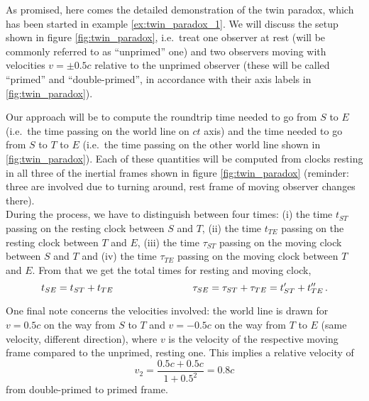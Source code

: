 \begin{ex}\label{ex:twin_paradox_2}
	As promised, here comes the detailed demonstration of the twin paradox, which has been started in example \ref{ex:twin_paradox_1}. We will discuss the setup shown in figure \ref{fig:twin_paradox}, i.e.~treat one observer at rest (will be commonly referred to as \enquote{unprimed} one) and two observers moving with velocities $v = \pm 0.5 c$ relative to the unprimed observer (these will be called \enquote{primed} and \enquote{double-primed}, in accordance with their axis labels in \ref{fig:twin_paradox}).
	
	Our approach will be to compute the roundtrip time needed to go from $S$ to $E$ (i.e.~the time passing on the world line on $ct$ axis) and the time needed to go from $S$ to $T$ to $E$ (i.e.~the time passing on the other world line shown in \ref{fig:twin_paradox}). Each of these quantities will be computed from clocks resting in all three of the inertial frames shown in figure \ref{fig:twin_paradox} (reminder: three are involved due to turning around, rest frame of moving observer changes there).\\
	
	
	During the process, we have to distinguish between four times: (i) the time $t_{ST}$ passing on the resting clock between $S$ and $T$, (ii) the time $t_{TE}$ passing on the resting clock between $T$ and $E$, (iii) the time $\tau_{ST}$ passing on the moving clock between $S$ and $T$ and (iv) the time $\tau_{TE}$ passing on the moving clock between $T$ and $E$. From that we get the total times for resting and moving clock,
	\begin{equation*}
		t_{SE} = t_{ST} + t_{TE}
		\qquad \qquad \qquad \qquad
		\tau_{SE} = \tau_{ST} + \tau_{TE} = t'_{ST} + t''_{TE} \, .
	\end{equation*}
	
	One final note concerns the velocities involved: the world line is drawn for $v = 0.5 c$ on the way from $S$ to $T$ and $v = -0.5 c$ on the way from $T$ to $E$ (same velocity, different direction), where $v$ is the velocity of the respective moving frame compared to the unprimed, resting one. This implies a relative velocity of
	\begin{equation*}
		v_2 = \frac{0.5 c + 0.5 c}{1 + 0.5^2} = 0.8 c
	\end{equation*}
	from double-primed to primed frame.
	

\end{ex}
